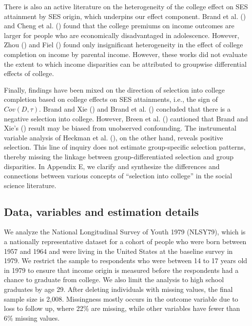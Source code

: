 \documentclass[12pt,a4paper]{article}
\begin{document}
There is also an active literature on the heterogeneity of the college effect on SES attainment by SES origin, which underpins our effect component. Brand et al. (\citeyear{brand_uncovering_2021}) and Cheng et al. (\citeyear{cheng_heterogeneous_2021}) found that the college premiums on income outcomes are larger for people who are economically disadvantaged in adolescence. However, Zhou (\citeyear{zhou_equalization_2019}) and Fiel (\citeyear{fiel_great_2020}) found only insignificant heterogeneity in the effect of college completion on income by parental income. However, these works did not evaluate the extent to which income disparities can be attributed to groupwise differential effects of college.

Finally, findings have been mixed on the direction of selection into college completion based on college effects on SES attainments, i.e., the sign of $Cov(D, \tau)$. Brand and Xie (\citeyear{brand_who_2010}) and Brand et al. (\citeyear{brand_uncovering_2021}) concluded that there is a negative selection into college. However, Breen et al. (\citeyear{breen_heterogeneous_2015}) cautioned that Brand and Xie's (\citeyear{brand_who_2010}) result may be biased from unobserved confounding. The instrumental variable analysis of Heckman et al. (\citeyear{heckman_returns_2018}), on the other hand, reveals positive selection. This line of inquiry does not estimate group-specific selection patterns, thereby missing the linkage between group-differentiated selection and group disparities. In Appendix E, we clarify and synthesize the differences and connections between various concepts of ``selection into college'' in the social science literature. 

\subsection{Data, variables and estimation details}
We analyze the National Longitudinal Survey of Youth 1979 (NLSY79), which is a nationally representative dataset for a cohort of people who were born between 1957 and 1964 and were living in the United States at the baseline survey in 1979.
We restrict the sample to respondents who were between 14 to 17 years old in 1979 to ensure that income origin is measured before the respondents had a chance to graduate from college. We also limit the analysis to high school graduates by age 29. After deleting individuals with missing values, the final sample size is 2,008. Missingness mostly occurs in the outcome variable due to loss to follow up, where 22\% are missing, while other variables have fewer than 6\% missing values.
\end{document}
